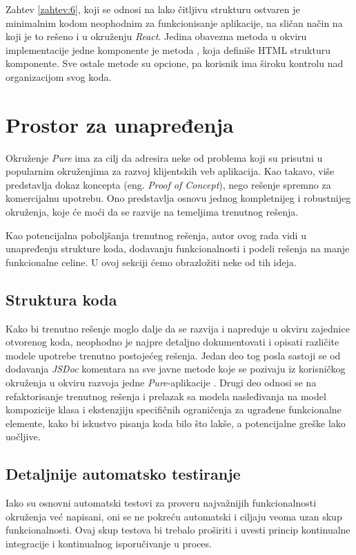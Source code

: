 \documentclass[12pt,oneside]{memoir}
\newcommand{\code}[1]{\allowbreak{\colorbox{codegray}{\texttt{\scalebox{0.9}{#1}}}}}%
\begin{document}
Zahtev \ref{zahtev:6}, koji se odnosi na lako čitljivu strukturu
ostvaren je minimalnim kodom neophodnim za funkcionisanje
aplikacije, na sličan način na koji je to rešeno i u okruženju
\emph{React}. Jedina obavezna metoda u okviru implementacije jedne
komponente je metoda \code{template()}, koja definiše HTML
strukturu komponente. Sve ostale metode su opcione, pa korisnik ima
široku kontrolu nad organizacijom svog koda.

\section{Prostor za unapređenja}
Okruženje \emph{Pure} ima za cilj da adresira neke od problema koji
su prisutni u popularnim okruženjima za razvoj klijentskih veb aplikacija.
Kao takavo, više predstavlja dokaz koncepta (eng. \emph{Proof of Concept}),
nego rešenje spremno za komercijalnu upotrebu. Ono predstavlja
osnovu jednog kompletnijeg i robustnijeg okruženja, koje će
moći da se razvije na temeljima trenutnog rešenja.

Kao potencijalna
poboljšanja trenutnog rešenja, autor ovog rada vidi u unapređenju
strukture koda, dodavanju funkcionalnosti i podeli rešenja na manje
funkcionalne celine. U ovoj sekciji ćemo obrazložiti neke od tih
ideja.
\subsection{Struktura koda}
Kako bi trenutno rešenje moglo dalje da se razvija i napreduje u
okviru zajednice otvorenog koda, neophodno je najpre detaljno
dokumentovati i opisati različite modele upotrebe trenutno
postojećeg rešenja. Jedan deo tog posla sastoji se od dodavanja
\emph{JSDoc} komentara na sve javne metode koje se pozivaju iz
korisničkog okruženja u okviru razvoja jedne
\emph{Pure}-aplikacije \cite{JSDoc}. Drugi deo odnosi se na refaktorisanje
trenutnog rešenja i prelazak sa modela nasleđivanja na model
kompozicije klasa i ekstenzjiju specifičnih ograničenja za ugrađene
funkcionalne elemente, kako bi iskustvo pisanja koda bilo što lakše,
a potencijalne greške lako uočljive.

\subsection{Detaljnije automatsko testiranje}
Iako su osnovni automatski testovi za proveru najvažnijih
funkcionalnosti okruženja već napisani, oni se ne pokreću
automatski i ciljaju veoma uzan skup funkcionalnosti. Ovaj skup
testova bi trebalo proširiti i uvesti princip kontinualne
integracije i kontinualnog isporučivanje u proces.
\end{document}

